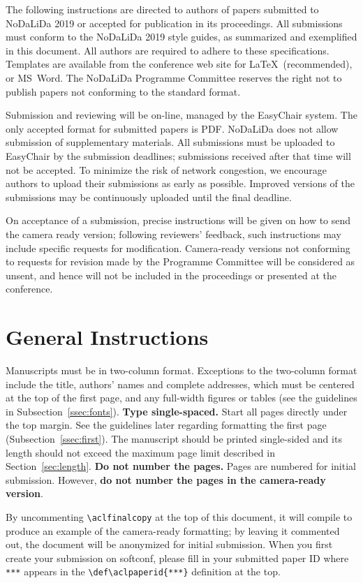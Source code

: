 \documentclass[11pt]{article}
\begin{document}
The following instructions are directed to authors of papers submitted
to NoDaLiDa 2019 or accepted for publication in its proceedings. 
All submissions must conform to the NoDaLiDa 2019 style guides, as summarized
and exemplified in this document. All authors are required to adhere to these specifications. 
Templates are available from the conference web site for \LaTeX\
(recommended), or MS~Word. The NoDaLiDa Programme Committee reserves
the right not to publish papers not conforming to the standard format. 

Submission and reviewing will be on-line, managed by the EasyChair system.
The only accepted format for submitted papers is PDF.
NoDaLiDa does not allow submission of supplementary materials.
All submissions must be uploaded to EasyChair by the submission deadlines;
submissions received after that time will not be accepted.
To minimize the risk of network congestion, we encourage authors to upload
their submissions as early as possible. 
Improved versions of the submissions may be continuously uploaded until the
final deadline. 

On acceptance of a submission, precise instructions will be given on how to
send the camera ready version; following reviewers' feedback, such instructions
may include specific requests for modification.
Camera-ready versions not conforming to requests for revision made by the
Programme Committee will be considered as unsent, and hence will not be
included in the proceedings or presented at the conference.

\section{General Instructions}

Manuscripts must be in two-column format.  Exceptions to the
two-column format include the title, authors' names and complete
addresses, which must be centered at the top of the first page, and
any full-width figures or tables (see the guidelines in
Subsection~\ref{ssec:fonts}). {\bf Type single-spaced.}  Start all
pages directly under the top margin. See the guidelines later
regarding formatting the first page (Subsection~\ref{ssec:first}).
The manuscript should be printed single-sided and its length should
not exceed the maximum page limit described in
Section~\ref{sec:length}.  {\bf Do not number the pages.}
Pages are numbered for  initial submission. However, {\bf do not number the pages in the camera-ready version}.

By uncommenting {\small\verb|\aclfinalcopy|} at the top of this 
 document, it will compile to produce an example of the camera-ready formatting; by leaving it commented out, the document will be anonymized for initial submission.  When you first create your submission on softconf, please fill in your submitted paper ID where {\small\verb|***|} appears in the {\small\verb|\def\aclpaperid{***}|} definition at the top.
\end{document}
